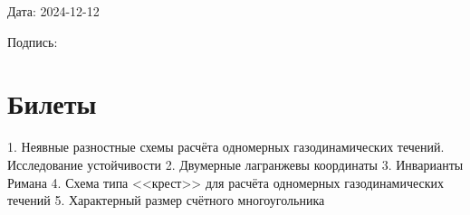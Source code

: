 \documentclass[a4paper,12pt]{article}
\begin{document}
Дата: 2024-12-12

Подпись: \underline{\hspace{3cm}}

\section*{Билеты}
1. Неявные разностные схемы расчёта одномерных газодинамических течений. Исследование устойчивости
2. Двумерные лагранжевы координаты
3. Инварианты Римана
4. Схема типа <<крест>> для расчёта одномерных газодинамических течений
5. Характерный размер счётного многоугольника
\end{document}
